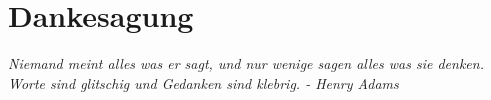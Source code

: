 %
%
\chapter*{Dankesagung}
\thispagestyle{empty}

\lipsum[1]

\vspace{0.5cm}

\begin{displayquote}
\textit{Niemand meint alles was er sagt, und nur wenige sagen alles was sie denken. Worte sind glitschig und Gedanken sind klebrig. - Henry Adams}
\end{displayquote}

\newpage